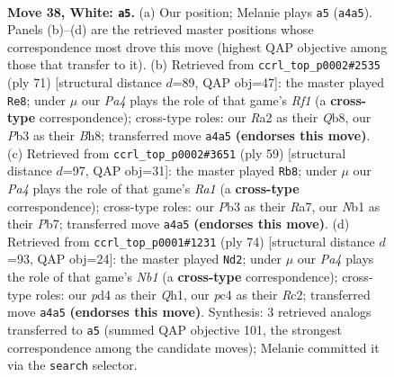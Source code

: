 \documentclass[11pt]{article}
\begin{document}
\clearpage

\begin{figure}[p]\centering
\begin{subfigure}{0.46\textwidth}\centering
\resizebox{\linewidth}{!}{%
\newchessgame
\chessboard[
  setfen={2b3k1/p1qn1r1p/1r3b2/5P2/Pppp4/1P4N1/R3P1Q1/1NBK2R1 w - - 0 38},
  showmover=false,
  pgfstyle=straightmove, color=movearrow, markmove={a4-a5}
]}
\caption{}
\end{subfigure}\hfill
\begin{subfigure}{0.46\textwidth}\centering
\resizebox{\linewidth}{!}{%
\newchessgame
\chessboard[
  setfen={1q3r1b/5p1k/2rp1Ppp/1p1Nn2n/1P2P3/7P/P2RQ1BK/B4R2 b - - 2 36},
  showmover=false,
  pgfstyle=straightmove, color=movearrow, markmove={f8-e8}
]}
\caption{}
\end{subfigure}
\\[4pt]
\begin{subfigure}{0.46\textwidth}\centering
\resizebox{\linewidth}{!}{%
\newchessgame
\chessboard[
  setfen={r4k2/rp1bqpp1/2p2n1p/P3p3/2B1P3/1NPQ3P/5PP1/1R1R2K1 b - - 3 30},
  showmover=false,
  pgfstyle=straightmove, color=movearrow, markmove={a8-b8}
]}
\caption{}
\end{subfigure}\hfill
\begin{subfigure}{0.46\textwidth}\centering
\resizebox{\linewidth}{!}{%
\newchessgame
\chessboard[
  setfen={2brr1k1/4qp2/p7/1p1pn1p1/3N4/P5P1/1PR1PP2/1N1R2KQ w - - 4 38},
  showmover=false,
  pgfstyle=straightmove, color=movearrow, markmove={b1-d2}
]}
\caption{}
\end{subfigure}
\caption{\textbf{Move 38, White: \texttt{a5}.} (a) Our position; Melanie plays \texttt{a5} (\texttt{a4a5}). Panels (b)--(d) are the retrieved master positions whose correspondence most drove this move (highest QAP objective among those that transfer to it). (b) Retrieved from \texttt{ccrl\_top\_p0002\#2535} (ply 71) [structural distance $d$=89, QAP obj=47]: the master played \texttt{Re8}; under $\mu$ our \emph{Pa4} plays the role of that game's \emph{Rf1} (a \textbf{cross-type} correspondence); cross-type roles: our \emph{R}a2 as their \emph{Q}b8, our \emph{P}b3 as their \emph{B}h8; transferred move \texttt{a4a5} \textbf{(endorses this move)}. (c) Retrieved from \texttt{ccrl\_top\_p0002\#3651} (ply 59) [structural distance $d$=97, QAP obj=31]: the master played \texttt{Rb8}; under $\mu$ our \emph{Pa4} plays the role of that game's \emph{Ra1} (a \textbf{cross-type} correspondence); cross-type roles: our \emph{P}b3 as their \emph{R}a7, our \emph{N}b1 as their \emph{P}b7; transferred move \texttt{a4a5} \textbf{(endorses this move)}. (d) Retrieved from \texttt{ccrl\_top\_p0001\#1231} (ply 74) [structural distance $d$=93, QAP obj=24]: the master played \texttt{Nd2}; under $\mu$ our \emph{Pa4} plays the role of that game's \emph{Nb1} (a \textbf{cross-type} correspondence); cross-type roles: our \emph{p}d4 as their \emph{Q}h1, our \emph{p}c4 as their \emph{R}c2; transferred move \texttt{a4a5} \textbf{(endorses this move)}. Synthesis: 3 retrieved analogs transferred to \texttt{a5} (summed QAP objective 101, the strongest correspondence among the candidate moves); Melanie committed it via the \texttt{search} selector.}
\label{fig:thought-m74}
\end{figure}
\end{document}
